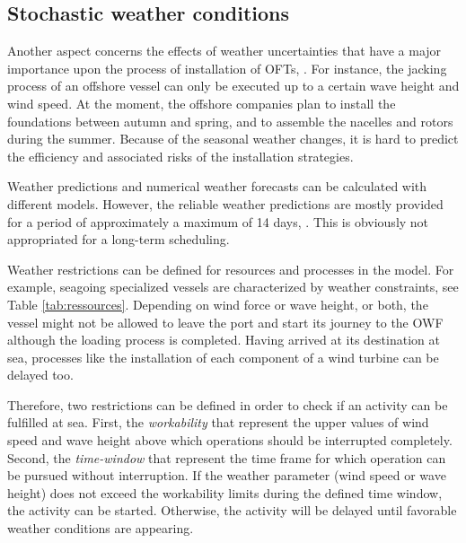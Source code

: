 \subsection{Stochastic weather conditions}
Another aspect concerns the effects of weather uncertainties that have a major importance upon the process of installation of OFTs, \cite{COMPIT11}. For instance, the jacking process of an offshore vessel can only be executed up to a certain wave height and wind speed. At the moment, the offshore companies plan to install the foundations between autumn and spring, and to assemble the nacelles and rotors during the summer. Because of the seasonal weather changes, it is hard to predict the efficiency and associated risks of the installation strategies.

Weather predictions and numerical weather forecasts can be calculated with different models. However, the reliable weather predictions are mostly provided for a period of approximately a maximum of 14 days, \cite{hinnenthal2007}. This is obviously not appropriated for a long-term scheduling.

Weather restrictions can be defined for resources and processes in the model. For example, seagoing specialized vessels are characterized by weather constraints, see Table \ref{tab:ressources}. Depending on wind force or wave height, or both, the vessel might not be allowed to leave the port and start its journey to the OWF although the loading process is completed. Having arrived at its destination at sea, processes like the installation of each component of a wind turbine can be delayed too.

Therefore, two restrictions can be defined in order to check if an activity can be fulfilled at sea. First, the \textit{workability} that represent the upper values of wind speed and wave height above which operations should be interrupted completely. Second, the \textit{time-window} that represent the time frame for which operation can be pursued without interruption.  If the weather parameter (wind speed or wave height) does not exceed the workability limits during the defined time window, the activity can be started. Otherwise, the activity will be delayed until favorable weather conditions are appearing.

